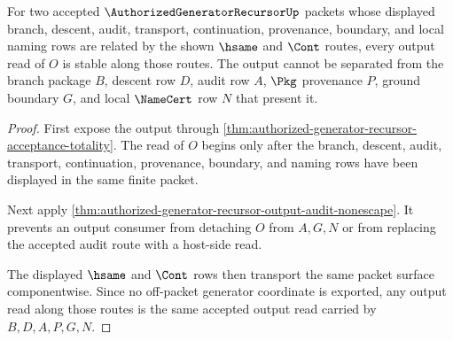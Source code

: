 \begin{theorem}
\label{thm:authorized-generator-recursor-output-stability}
For two accepted $\AuthorizedGeneratorRecursorUp$ packets whose displayed branch, descent, audit, transport, continuation, provenance, boundary, and local naming rows are related by the shown $\hsame$ and $\Cont$ routes, every output read of $O$ is stable along those routes. The output cannot be separated from the branch package $B$, descent row $D$, audit row $A$, $\Pkg$ provenance $P$, ground boundary $G$, and local $\NameCert$ row $N$ that present it.
\end{theorem}
\begin{proof}
First expose the output through \autoref{thm:authorized-generator-recursor-acceptance-totality}. The read of $O$ begins only after the branch, descent, audit, transport, continuation, provenance, boundary, and naming rows have been displayed in the same finite packet.

Next apply \autoref{thm:authorized-generator-recursor-output-audit-nonescape}. It prevents an output consumer from detaching $O$ from $A,G,N$ or from replacing the accepted audit route with a host-side read.

The displayed $\hsame$ and $\Cont$ rows then transport the same packet surface componentwise. Since no off-packet generator coordinate is exported, any output read along those routes is the same accepted output read carried by $B,D,A,P,G,N$.
\end{proof}

